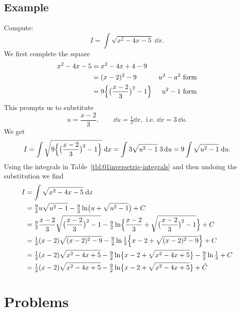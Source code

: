 \subsection{Example} Compute: %
\[
I= \int \sqrt{x^2-4x-5}\; \dd x.
\]
We first complete the square
\begin{align*}
  x^2-4x-5
  &= x^2-4x + 4 - 9 \\
  &= (x-2)^2 - 9 & u^2-a^2 \text{ form}\\
  &= 9\Bigl\{\bigl(\frac{x-2}{3}\bigr)^2 - 1\Bigr\} &u^2 - 1\text{ form}
\end{align*}
This prompts us to substitute
\[
u = \frac{x-2}{3}, \qquad \dd u = \tfrac13 \dd x, \text{ i.e. }\dd x = 3\,\dd u.
\]
We get
\[
I = \int \sqrt{9\Bigl\{\bigl(\frac{x-2}{3}\bigr)^2 - 1\Bigr\}} \; \mathrm{d} x = \int
3\sqrt{u^2-1}\; 3\,\mathrm{d} u = 9\int \sqrt{u^2-1}\; \mathrm{d} u.
\]
Using the integrals in Table~\ref{tbl:01inversetrig-integrals} and then undoing
the substitution we find
\begin{align*}
  I&= \int \sqrt{x^2-4x-5}\; \mathrm{d} x \\
  &= \tfrac92 u\sqrt{u^2-1} - \tfrac92 \ln\bigl(u+\sqrt{u^2-1}\bigr) + C \\
  &= \tfrac92 \frac{x-2}{3} \sqrt{\bigl(\frac{x-2}{3}\bigr)^2 - 1}
  -\tfrac 92 \ln\Bigl\{ \frac{x-2}{3} + \sqrt{\bigl(\frac{x-2}{3}\bigr)^2 - 1}\Bigr\} +C \\
  &= \tfrac12 (x-2) \sqrt{(x-2)^2 - 9}
  -\tfrac 92 \ln\tfrac13\Bigl\{ x-2 + \sqrt{(x-2)^2 - 9}\Bigr\} +C \\
  &= \tfrac12 (x-2) \sqrt{x^2 -4x + 5} -\tfrac 92 \ln\bigl\{ x-2 + \sqrt{x^2 -4x
    + 5}\bigr\} -\tfrac92 \ln\tfrac13
  + C \\
  &= \tfrac12 (x-2) \sqrt{x^2 -4x + 5} -\tfrac 92 \ln\bigl\{ x-2 + \sqrt{x^2 -4x
    + 5}\bigr\} + \tilde C
\end{align*}

\section{Problems} %


